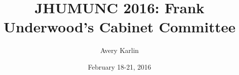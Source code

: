 \documentclass[11 pt, twoside]{article}
\begin{document}
\title{JHUMUNC 2016: Frank Underwood's Cabinet Committee}
\author{Avery Karlin}
\date{February 18-21, 2016}

\maketitle
\newpage
\tableofcontents
\vspace{11pt}
\newpage
\end{document}
